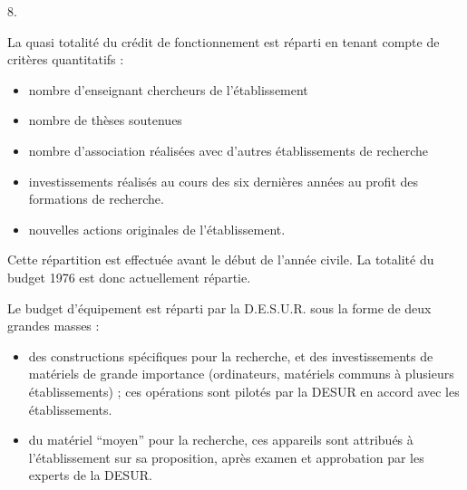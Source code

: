 
8.


La quasi totalité du crédit de fonctionnement est réparti en tenant compte de critères quantitatifs :
\begin{itemize}
\item[-] nombre d'enseignant chercheurs de l'établissement
\item[-] nombre de thèses soutenues
\item[-] nombre d'association réalisées avec d'autres établissements de recherche
\item[-] investissements réalisés au cours des six dernières années au profit des formations de recherche.
\item[-] nouvelles actions originales de l'établissement.
\end{itemize}

Cette répartition est effectuée avant le début de l'année civile. La totalité du budget 1976 est donc actuellement répartie.

Le budget d'équipement est réparti par la D.E.S.U.R. sous la forme de deux grandes masses :

\begin{itemize}
\item[-] des constructions spécifiques pour la recherche, et des investissements de matériels de grande importance (ordinateurs, matériels communs à plusieurs établissements) ; ces opérations sont pilotés par la DESUR en accord avec les établissements.
\item[-] du matériel ``moyen'' pour la recherche, ces appareils sont attribués à l'établissement sur sa proposition, après examen et approbation par les experts de la DESUR.
\end{itemize}

